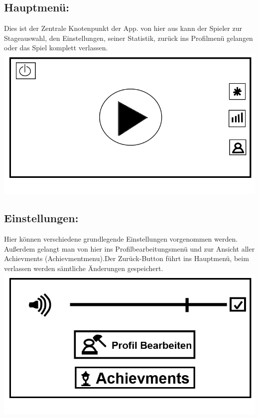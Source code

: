\documentclass{scrartcl}
\begin{document}
\begin{enumerate}
	\begin{minipage}{1\textwidth}
		\item \subsection*{Hauptmenü:} \label{appaufbau:Hauptmenü}
		Dies ist der Zentrale Knotenpunkt der App. von hier aus kann der Spieler zur Stageauswahl, den Einstellungen, seiner Statistik, zurück ins Profilmenü gelangen oder das Spiel komplett verlassen.\\
		\includegraphics[width=\textwidth, height=7.5cm]{assets/Mainmenu}
	\end{minipage}
	
	\begin{minipage}{1\textwidth}
		\item \subsection*{Einstellungen:}
		Hier können verschiedene grundlegende Einstellungen vorgenommen werden. Außerdem gelangt man von hier ins Profilbearbeitungsmenü und zur Ansicht aller Achievments (Achievmentmenu).Der Zurück-Button führt ins Hauptmenü, beim verlassen werden sämtliche Änderungen gespeichert.\\
		\includegraphics[width=\textwidth, height=7.5cm]{assets/Einstellungen}
	\end{minipage}


\end{enumerate}
\end{document}
